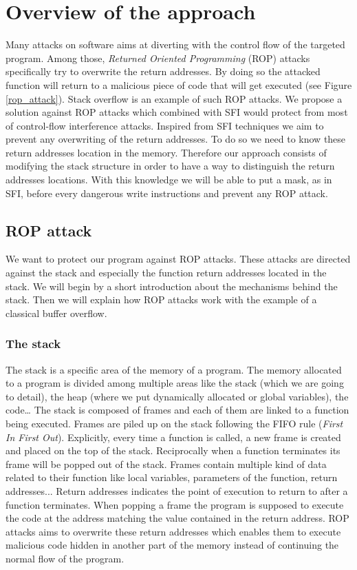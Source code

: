 \documentclass[11pt]{sdm}
\begin{document}
\section{Overview of the approach}
\label{sec:Overview of the approach}
	Many attacks on software aims at diverting with the control flow of the targeted program. Among those, \textit{Returned Oriented Programming} (ROP) attacks specifically try to overwrite the return addresses.
By doing so the attacked function will return to a malicious piece of code that will get executed (see Figure \ref{rop_attack}).
Stack overflow is an example of such ROP attacks.
We propose a solution against ROP attacks which combined with SFI would protect from most of control-flow interference attacks.
Inspired from SFI techniques we aim to prevent any overwriting of the return addresses. To do so we need to know these return addresses location in the memory. Therefore our approach consists of modifying the stack structure in order to have a way to distinguish the return addresses locations. With this knowledge we will be able to put a mask, as in SFI, before every dangerous write instructions and prevent any ROP attack.

\subsection{ROP attack}
\label{sub:Issue}

	We want to protect our program against ROP attacks. These attacks are directed against the stack and especially the function return addresses located in the stack.
We will begin by a short introduction about the mechanisms behind the stack. Then we will explain how ROP attacks work with the example of a classical buffer overflow.

\subsubsection{The stack}
\label{ssub:The stack}
	The stack is a specific area of the memory of a program. The memory allocated to a program is divided among multiple areas like the stack (which we are going to detail), the heap (where we put dynamically allocated or global variables), the code\dots
The stack is composed of frames and each of them are linked to a function being executed. Frames are piled up on the stack following the FIFO rule (\textit{First In First Out}). Explicitly, every time a function is called, a new frame is created and placed on the top of the stack. Reciprocally when a function terminates its frame will be popped out of the stack.
Frames contain multiple kind of data related to their function like local variables, parameters of the function, return addresses... Return addresses indicates the point of execution to return to after a function terminates. When popping a frame the program is supposed to execute the code at the address matching the value contained in the return address.
ROP attacks aims to overwrite these return addresses which enables them to execute malicious code hidden in another part of the memory instead of continuing the normal flow of the program.
\end{document}
